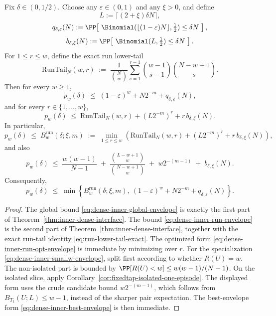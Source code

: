 \begin{corollary}
\label{cor:dense-inner-piecewise}
Fix $\delta\in(0,1/2)$.
Choose any $\varepsilon\in(0,1)$ and any $\xi>0$, and define
\[
L:=\lceil(2+\xi)\delta N\rceil,
\]
\[
q_{\delta,\varepsilon}(N)
:=
\PP\!\left[\ \Binomial(\lfloor(1-\varepsilon)N\rfloor,\tfrac12)\le \delta N\ \right],
\]
\[
b_{\delta,\xi}(N)
:=
\PP\!\left[\ \Binomial(L,\tfrac12)\le \delta N\ \right].
\]
For $1\le r\le w$, define the exact run lower-tail
\[
\mathrm{RunTail}_N(w,r)
\;:=\;
\frac{1}{\binom{N}{w}}
\sum_{s=1}^{r-1}
\binom{w-1}{s-1}\binom{N-w+1}{s}.
\]
Then for every $w\ge 1$,
\begin{equation}
\label{eq:dense-inner-global-envelope}
p_w(\delta)
\;\le\;
(1-\varepsilon)^w + N2^{-m} + q_{\delta,\varepsilon}(N),
\end{equation}
and for every $r\in\{1,\dots,w\}$,
\begin{equation}
\label{eq:dense-inner-run-envelope}
p_w(\delta)
\;\le\;
\mathrm{RunTail}_N(w,r) + (L2^{-m})^r + r\,b_{\delta,\xi}(N).
\end{equation}
In particular,
\begin{equation}
\label{eq:dense-inner-run-opt-envelope}
p_w(\delta)
\;\le\;
B_w^{\mathrm{run}}(\delta;\xi,m)
\;:=\;
\min_{1\le r\le w}
\left(
\mathrm{RunTail}_N(w,r) + (L2^{-m})^r + r\,b_{\delta,\xi}(N)
\right),
\end{equation}
and also
\begin{equation}
\label{eq:dense-inner-smallw-envelope}
p_w(\delta)
\;\le\;
\frac{w(w-1)}{N-1}
\;+\;
\frac{\binom{L-w+1}{w}}{\binom{N-w+1}{w}}
\;+\;
w2^{-(m-1)}
\;+\;
b_{\delta,\xi}(N).
\end{equation}
Consequently,
\begin{equation}
\label{eq:dense-inner-best-envelope}
p_w(\delta)
\;\le\;
\min\!\left\{
B_w^{\mathrm{run}}(\delta;\xi,m),\ 
(1-\varepsilon)^w + N2^{-m} + q_{\delta,\varepsilon}(N)
\right\}.
\end{equation}
\end{corollary}

\begin{proof}
The global bound \eqref{eq:dense-inner-global-envelope} is exactly the first part of
Theorem~\ref{thm:inner-dense-interface}.
The bound \eqref{eq:dense-inner-run-envelope} is the second part of
Theorem~\ref{thm:inner-dense-interface}, together with the exact run-tail identity
\eqref{eq:run-lower-tail-exact}.
The optimized form \eqref{eq:dense-inner-run-opt-envelope} is immediate by minimizing over $r$.
For the specialization \eqref{eq:dense-inner-smallw-envelope}, split first according to whether \(R(U)=w\). The
non-isolated part is bounded by \(\PP[R(U)<w]\le w(w-1)/(N-1)\). On the isolated slice, apply
Corollary~\ref{cor:fixedtap-isolated-one-episode}. The displayed form uses the crude candidate bound
\(w2^{-(m-1)}\), which follows from \(B_{T_1}(U;L)\le w-1\), instead of the sharper pair expectation.
The best-envelope form \eqref{eq:dense-inner-best-envelope} is then immediate.
\end{proof}

